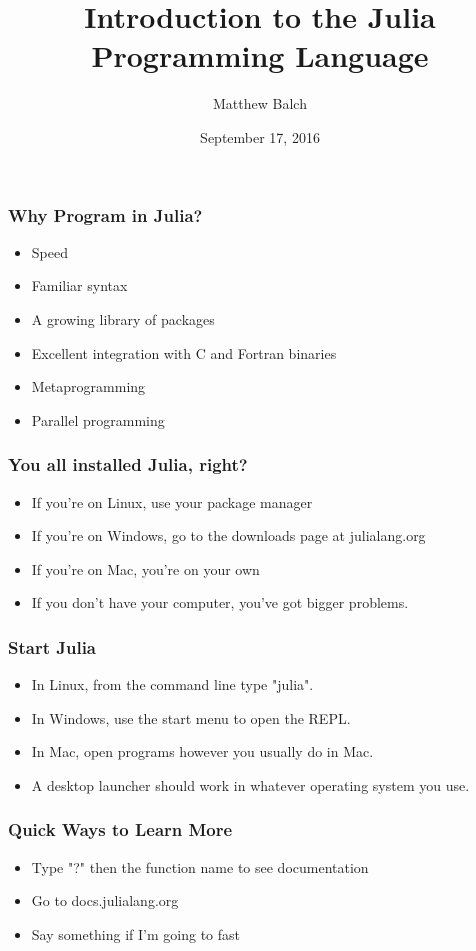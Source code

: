 \documentclass{beamer}
\title[Julia]{Introduction to the Julia Programming Language}
\author{Matthew Balch}
\institute{HackRVA}
\date{September 17, 2016}
\begin{document}
\frame{\titlepage}

\begin{frame}
\frametitle{Why Program in Julia?}
\begin{itemize}
  \item Speed
  \item Familiar syntax
  \item A growing library of packages
  \item Excellent integration with C and Fortran binaries
  \item Metaprogramming
  \item Parallel programming
\end{itemize}
\end{frame}

\begin{frame}
\frametitle{You all installed Julia, right?}
\begin{itemize}
  \item If you're on Linux, use your package manager
  \item If you're on Windows, go to the downloads page at julialang.org
  \item If you're on Mac, you're on your own
  \item If you don't have your computer, you've got bigger problems.
\end{itemize}
\end{frame}

\begin{frame}
\frametitle{Start Julia}
\begin{itemize}
  \item In Linux, from the command line type "julia".
  \item In Windows, use the start menu to open the REPL.
  \item In Mac, open programs however you usually do in Mac.
  \item A desktop launcher should work in whatever operating system you use.
\end{itemize}
\end{frame}

\begin{frame}
\frametitle{Quick Ways to Learn More}
\begin{itemize}
  \item Type "?" then the function name to see documentation
  \item Go to docs.julialang.org
  \item Say something if I'm going to fast
\end{itemize}
\end{frame}
\end{document}
